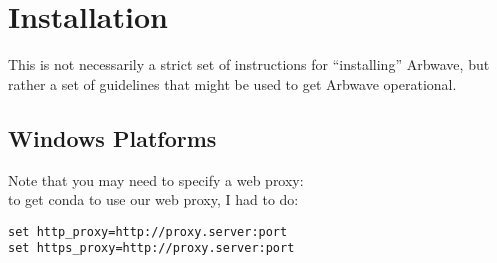 \section{Installation}
This is not necessarily a strict set of instructions for ``installing'' Arbwave,
but rather a set of guidelines that might be used to get Arbwave operational.

\subsection{Windows Platforms}

Note that you may need to specify a web proxy:\\
to get conda to use our web proxy, I had to do:
\begin{verbatim}
set http_proxy=http://proxy.server:port
set https_proxy=http://proxy.server:port
\end{verbatim}


